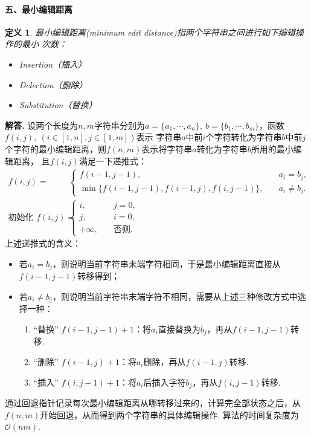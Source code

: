 \documentclass[12pt, a4paper, oneside]{ctexart}
\newtheorem{definition}{定义}
\numberwithin{equation}{section}  %
\newenvironment{solution}[1][]{\par\noindent\textbf{#1解答. }}{\smallskip\par}  %
\def\O{\mathcal{O}}         %
\begin{document}
\paragraph{五、最小编辑距离}
\begin{definition}
最小编辑距离(minimum edit distance)指两个字符串之间进行如下编辑操作的最小
次数：
\begin{itemize}
    \item Insertion（插入）
    \item Delection（删除）
    \item Substitution（替换）
\end{itemize}
\end{definition}
\begin{solution}
设两个长度为$n,m$字符串分别为$a = \{a_1,\cdots, a_n\},\ b=\{b_1,\cdots,b_m\}$，函数$f(i,j),\ (i\in[1,n],j\in[1,m])$表示
字符串$a$中前$i$个字符转化为字符串$b$中前$j$个字符的最小编辑距离，则$f(n,m)$表示将字符串$a$转化为字符串$b$所用的最小编辑距离，
且$f(i,j)$满足一下递推式：
\begin{align*}
    f(i,j) =&\ \begin{cases}
        f(i-1,j-1),&\quad a_i = b_j,\\
        \min\{f(i-1,j-1),f(i-1,j),f(i,j-1)\},&\quad a_i\neq b_j.
    \end{cases}\\
    \text{初始化 } f(i, j) =&\ \begin{cases}
        i,&\quad j = 0,\\
        j,&\quad i = 0,\\
        +\infty,&\quad \text{否则}.
    \end{cases}
\end{align*}
上述递推式的含义：
\begin{itemize}
    \item 若$a_i=b_j$，则说明当前字符串末端字符相同，于是最小编辑距离直接从$f(i-1,j-1)$转移得到；
    \item 若$a_i\neq b_j$，则说明当前字符串末端字符不相同，需要从上述三种修改方式中选择一种：
    \begin{enumerate}
        \item “替换” $f(i-1,j-1)+1$：将$a_i$直接替换为$b_j$，再从$f(i-1,j-1)$转移.
        \item “删除” $f(i-1, j)+1$：将$a_i$删除，再从$f(i-1,j)$转移.
        \item “插入” $f(i,j-1)+1$：将$a_i$后插入字符$b_j$，再从$f(i,j-1)$转移.
    \end{enumerate}
\end{itemize}
通过回退指针记录每次最小编辑距离从哪转移过来的，计算完全部状态之后，从$f(n,m)$开始回退，从而得到两个字符串的具体编辑操作.
算法的时间复杂度为$\O(nm)$.
\end{solution}
\end{document}
